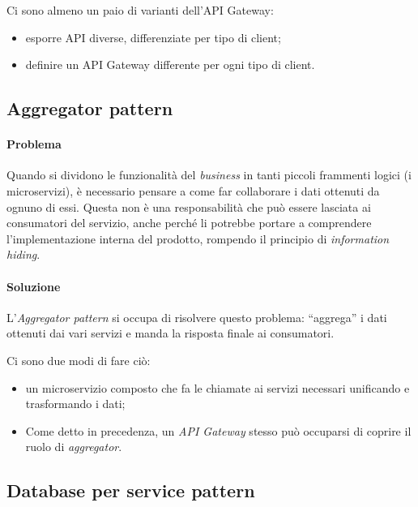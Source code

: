 Ci sono almeno un paio di varianti dell'API Gateway:

\begin{itemize}
	\item esporre API diverse, differenziate per tipo di client;
	\item definire un API Gateway differente per ogni tipo di client.
\end{itemize}


\subsection{Aggregator pattern}

\paragraph*{Problema} Quando si dividono le funzionalità del \textit{business} in tanti piccoli frammenti logici (i microservizi), è necessario pensare
a come far collaborare i dati ottenuti da ognuno di essi.
Questa non è una responsabilità che può essere lasciata ai consumatori del servizio, anche perché li potrebbe portare a comprendere l'implementazione interna del prodotto, rompendo il principio di \textit{information hiding}.

\paragraph*{Soluzione} L'\textit{Aggregator pattern} si occupa di risolvere questo problema: ``aggrega'' i dati ottenuti dai vari servizi e
manda la risposta finale ai consumatori.

Ci sono due modi di fare ciò:
\begin{itemize}
	\item un microservizio composto che fa le chiamate ai servizi necessari
	unificando e trasformando i dati;
	\item Come detto in precedenza, un \textit{API Gateway} stesso può occuparsi di coprire il ruolo di \textit{aggregator}.
\end{itemize}


\subsection{Database per service pattern}

